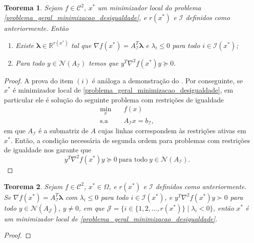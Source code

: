 \documentclass[12pt,a4paper]{scrartcl}
\def\RR{\mathds{R}}
\newtheorem{teo}{Teorema}
\theoremstyle{definition}%
\begin{document}
\begin{teo} \label{teo:condicao_necessaria_2ordem_desigualdade}
Sejam $f \in \mathcal{C}^{2}$, $x^{*}$ um minimizador local do problema \eqref{problema_geral_minimizacao_desigualdade}, e $r(x^{*})$ e $\mathcal{I}$ definidos como anteriormente. Então
\begin{enumerate}
	\item[(i)] Existe $\boldsymbol{\lambda} \in \RR^{r(x^{*})}$ tal que $\nabla f(x^{*}) = A_{\mathcal{I}}^{T} \boldsymbol{\lambda}$ e $\lambda_{i} \leq 0$ para todo $i \in \mathcal{I}(x^{*})$;

	\item[(ii)] Para todo $y \in \mathcal{N}(A_{\mathcal{I}})$ temos que $y^{T} \nabla^{2} f(x^{*})y \succcurlyeq 0$.
\end{enumerate}
\end{teo}
\begin{proof}
A prova do item $(i)$ é análoga a demonstração do .
Por conseguinte, se $x^{*}$ é minimizador local de \eqref{problema_geral_minimizacao_desigualdade}, em particular ele é solução do seguinte problema com restrições de igualdade
\[ 
\begin{aligned}
\min_{x} & \quad f(x) \\
\text{s.a} & \quad A_{\mathcal{I}}x=b_{\mathcal{I}} ,
\end{aligned}
\]
em que $A_{\mathcal{I}}$ é a submatriz de $A$ cujas linhas correspondem às restrições ativas em $x^{*}$. Então, a condição necessária de segunda ordem para problemas com restrições de igualdade nos garante que
\[
y^{T}\nabla^{2} f(x^{*})y \succcurlyeq 0 \ \text{para todo} \ y \in \mathcal{N}(A_{\mathcal{I}}) .
\]
\end{proof}


\begin{teo} \label{teo:condicao_suficiente_2ordem_desigualdade}
Sejam $f \in \mathcal{C}^{2}$, $x^{*} \in \Omega$, e $r(x^{*})$ e $\mathcal{I}$ definidos como anteriormente. Se $\nabla f(x^{*}) = A_{\mathcal{I}}^{T} \boldsymbol{\lambda}$ com $\lambda_{i} \leq 0$ para todo $i \in \mathcal{I}(x^{*})$, e $y^{T} \nabla^{2} f(x^{*})y \succ 0$ para todo $y \in \mathcal{N}(A_{\mathcal{J}})$, $y\neq 0$, em que $\mathcal{J} = \{ i\in \{ 1,2, \ldots , r(x^{*}) \} \mid \lambda_{i} <0 \}$, então $x^{*}$ é um minimizador local de \eqref{problema_geral_minimizacao_desigualdade}.
\end{teo}
\begin{proof}

\end{proof}
\end{document}
